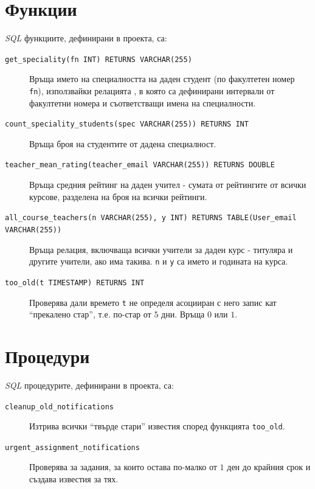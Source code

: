 \documentclass[a4paper,10pt, leqno]{article}
\newcommand{\attr}[1] {\texttt{#1}}
\newcommand{\la}[1] {\textsl{#1}}
\newcommand{\func}[1] {\texttt{#1}}
\begin{document}
      \section{Функции}
       \la{SQL} функциите, дефинирани в проекта, са:
       \begin{description}
	 \item[\func{get\_speciality(fn INT) RETURNS VARCHAR(255)}]
	   Връща името на специалността на даден студент (по факултетен номер \attr{fn}),
	   използвайки релацията , в която са дефинирани интервали от факултетни номера
	   и съответстващи имена на специалности.
	 \item[ \func{count\_speciality\_students(spec VARCHAR(255)) RETURNS INT}]
	   Връща броя на студентите от дадена специалност.
	 \item[ \func{teacher\_mean\_rating(teacher\_email VARCHAR(255)) RETURNS DOUBLE}]
	   Връща средния рейтинг на даден учител - сумата от рейтингите от всички курсове, разделена на броя на всички рейтинги.
	 \item[ \func{all\_course\_teachers(n VARCHAR(255), y INT) RETURNS TABLE(User\_email VARCHAR(255))}]
	   Връща релация, включваща всички учители за даден курс - титуляра и другите учители, ако има такива.
	   \attr{n} и \attr{y} са името и годината на курса.
	 \item[ \func{too\_old(t TIMESTAMP) RETURNS INT} ]
	   Проверява дали времето \attr{t} не определя асоцииран с него запис кат ``прекалено стар'', т.е. по-стар от $5$ дни.  Връща $0$ или $1$.
       \end{description}

      \section{Процедури}
       \la{SQL} процедурите, дефинирани в проекта, са:
       \begin{description}
	 \item[\func{cleanup\_old\_notifications}]
	   Изтрива всички ``твърде стари'' известия според функцията \func{too\_old}.
	\item[\func{urgent\_assignment\_notifications}]
	   Проверява за задания, за които остава по-малко от $1$ ден до крайния срок и създава известия за тях.
       \end{description}
\end{document}
